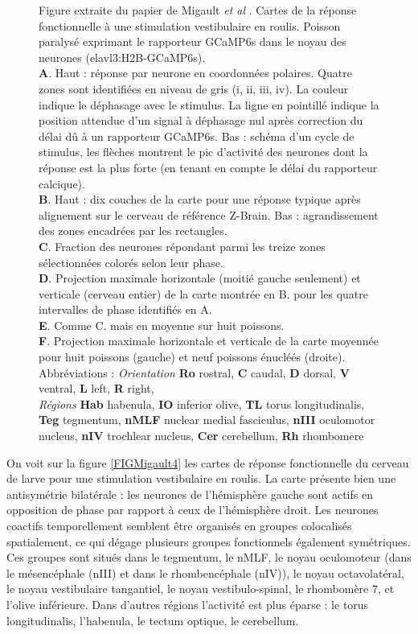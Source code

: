\addtocounter{figure}{-1}
\begin{figure}
    \caption{
    Figure extraite du papier de Migault \emph{et al} \cite{migault_whole-brain_2018}. Cartes de la réponse fonctionnelle à une stimulation vestibulaire en roulis. Poisson paralysé exprimant le rapporteur GCaMP6s dans le noyau des neurones (elavl3:H2B-GCaMP6s).
    \\\textbf{A}. Haut : réponse par neurone en coordonnées polaires. Quatre zones sont identifiées en niveau de gris (i, ii, iii, iv). La couleur indique le déphasage avec le stimulus. La ligne en pointillé indique la position attendue d'un signal à déphasage nul après correction du délai dû à un rapporteur GCaMP6s. Bas : schéma d'un cycle de stimulus, les flèches montrent le pic d'activité des neurones dont la réponse est la plus forte (en tenant en compte le délai du rapporteur calcique).
    \\\textbf{B}. Haut : dix couches de la carte pour une réponse typique après alignement sur le cerveau de référence Z-Brain. Bas : agrandissement des zones encadrées par les rectangles.
    \\\textbf{C}. Fraction des neurones répondant parmi les treize zones sélectionnées colorés selon leur phase.
    \\\textbf{D}. Projection maximale horizontale (moitié gauche seulement) et verticale (cerveau entier) de la carte montrée en B. pour les quatre intervalles de phase identifiés en A.
    \\\textbf{E}. Comme C. mais en moyenne sur huit poissons.
    \\\textbf{F}. Projection maximale horizontale et verticale de la carte moyennée pour huit poissons (gauche) et neuf poissons énucléés (droite).
    \\Abbréviations : \emph{Orientation} \textbf{Ro} rostral, \textbf{C} caudal, \textbf{D} dorsal, \textbf{V} ventral, \textbf{L} left, \textbf{R} right,
    \\\emph{Régions}  \textbf{Hab} habenula, \textbf{IO} inferior olive, \textbf{TL} torus longitudinalis, \textbf{Teg} tegmentum, \textbf{nMLF} nuclear medial fasciculus, \textbf{nIII} oculomotor nucleus, \textbf{nIV} trochlear nucleus, \textbf{Cer} cerebellum, \textbf{Rh} rhombomere
    }
    \end{figure}

On voit sur la figure \ref{FIGMigault4} les cartes de réponse fonctionnelle du cerveau de larve pour une stimulation vestibulaire en roulis. La carte présente bien une antisymétrie bilatérale : les neurones de l'hémisphère gauche sont actifs en opposition de phase par rapport à ceux de l'hémisphère droit. Les neurones coactifs temporellement semblent être organisés en groupes colocalisés spatialement, ce qui dégage plusieurs groupes fonctionnels également symétriques.
Ces groupes sont situés dans le tegmentum, le nMLF, le noyau oculomoteur (dans le mésencéphale (nIII) et dans le rhombencéphale (nIV)), le noyau octavolatéral, le noyau vestibulaire tangantiel, le noyau vestibulo-spinal, le rhombomère 7, et l'olive inférieure. Dans d'autres régions l'activité est plus éparse : le torus longitudinalis, l'habenula, le tectum optique, le cerebellum.

